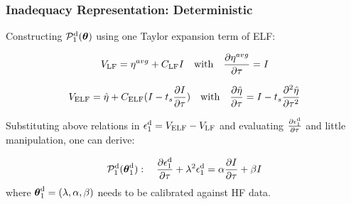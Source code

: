 \documentclass[10pt,xcolor=dvipsnames,compress]{beamer}
\begin{document}
\begin{frame}
\frametitle{Inadequacy Representation: Deterministic}
\vfill


Constructing $\mathcal{P}_1^{\rm d}(\boldsymbol{\theta})$ using one Taylor expansion term of ELF: 

\begin{equation*}
V_{\rm LF} = {\eta}^{avg} + C_{\rm LF} I
\quad {\rm with} \quad 
\frac{\partial{{\eta}^{avg}}}{\partial\tau} = I
\end{equation*}

\begin{equation*}
V_{\rm ELF} = \hat{\eta} + C_{\rm ELF} (
I - t_s \frac{\partial I}{\partial \tau}
)
\quad {\rm with} \quad 
\frac{\partial{\hat{\eta}}}{\partial\tau} = I - t_s  \frac{\partial^2{\hat{\eta}}}{\partial\tau^2}
\end{equation*}

Substituting above relations in $\epsilon_1^{\rm d} = V_{\rm ELF}- V_{\rm LF}$ and evaluating $\frac{\partial\epsilon_1^{\rm d}}{\partial\tau}$ and little manipulation, one can derive:

\begin{block}{}

\begin{equation*}
\mathcal{P}_1^{\rm d}(\boldsymbol{\theta}_1^{\rm d}) : \quad
\frac{\partial\epsilon_1^{\rm d}}{\partial\tau} + \lambda^2\epsilon_1^{\rm d} = \alpha \frac{\partial I}{\partial\tau} + \beta I
\end{equation*}
where $
\boldsymbol{\theta}_1^{\rm d}=
(\lambda, \alpha, \beta)
$ needs to be calibrated against HF data.

\end{block}

\vfill
\end{frame}
\end{document}
